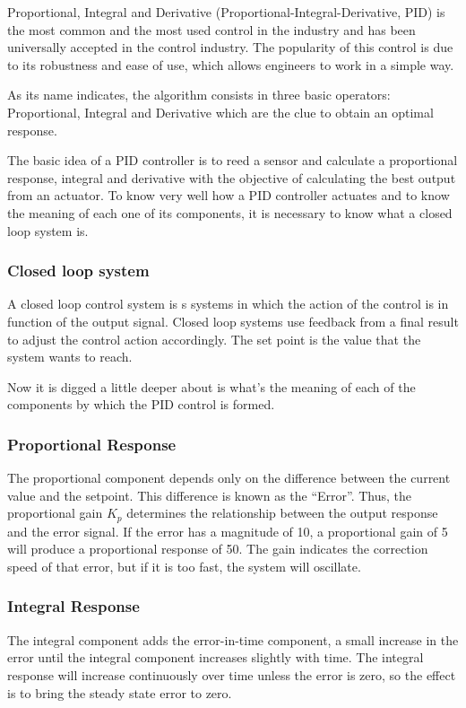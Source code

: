 Proportional, Integral and Derivative\cite{nemadesign} (Proportional-Integral-Derivative, PID) is the most common and the most used control in the industry and has been universally accepted in the control industry. The popularity of this control is due to its robustness and ease of use, which allows engineers to work in a simple way. \newline

As its name indicates, the algorithm consists in three basic operators: Proportional, Integral and Derivative which are the clue to obtain an optimal response. \newline

The basic idea of a PID controller is to reed a sensor and calculate a proportional response, integral and derivative with the objective of calculating the best output from an actuator. \newline
\newpage
To know very well how a PID controller actuates and to know the meaning of each one of its components, it is necessary to know what a closed loop system is. 

\subsubsection{Closed loop system}
A closed loop control system is s systems in which the action of the control is in function of the output signal. Closed loop systems use feedback from a final result to adjust the control action accordingly. The set point is the value that the system wants to reach. \newline

Now it is digged a little deeper about is what’s the meaning of each of the components by which the PID control is formed.\newline
\subsubsection{Proportional Response}

The proportional component depends only on the difference between the current value and the setpoint. This difference is known as the “Error”. Thus, the proportional gain $K_{p}$ determines the relationship between the output response and the error signal. If the error has a magnitude of 10, a proportional gain of 5 will produce a proportional response of 50. The gain indicates the correction speed of that error, but if it is too fast, the system will oscillate. 
\subsubsection{Integral Response}
The integral component adds the error-in-time component, a small increase in the error until the integral component increases slightly with time. The integral response will increase continuously over time unless the error is zero, so the effect is to bring the steady state error to zero.
